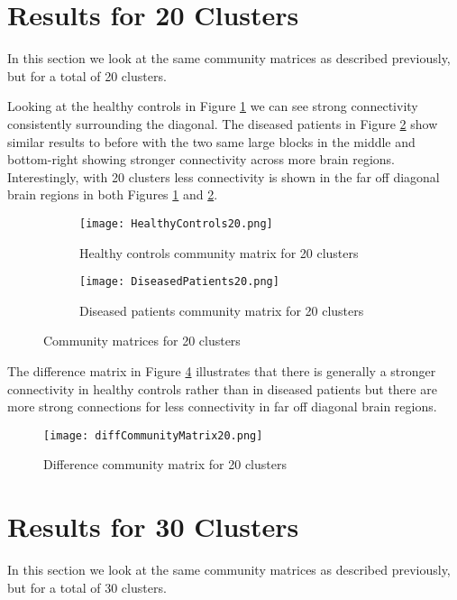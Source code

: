 \section{Results for 20 Clusters}
In this section we look at the same community matrices as described previously, but for a total of 20 clusters.

Looking at the healthy controls in Figure \ref{fig:CM20healthy} we can see strong connectivity consistently surrounding the diagonal. The diseased patients in Figure \ref{fig:CM20diseased} show similar results to before with the two same large blocks in the middle and bottom-right showing stronger connectivity across more brain regions. Interestingly, with 20 clusters less connectivity is shown in the far off diagonal brain regions in both Figures \ref{fig:CM20healthy} and \ref{fig:CM20diseased}.

\begin{figure}[h!] 
	\centering
	\begin{subfigure}[b]{.49\textwidth}
		\texttt{[image: HealthyControls20.png]}
		\caption{Healthy controls community matrix for 20 clusters}
		\label{fig:CM20healthy}
	\end{subfigure}
	\begin{subfigure}[b]{.49\textwidth}
		\texttt{[image: DiseasedPatients20.png]}
		\caption{Diseased patients community matrix for 20 clusters}
		\label{fig:CM20diseased}
	\end{subfigure}
	\caption{Community matrices for 20 clusters}
	\label{fig:CM20}
\end{figure}

The difference matrix in Figure \ref{fig:CM20diff} illustrates that there is generally a stronger connectivity in healthy controls rather than in diseased patients but there are more strong connections for  less connectivity in far off diagonal brain regions. 

\begin{figure}[h!] 
	\centering
	\texttt{[image: diffCommunityMatrix20.png]}
	\caption{Difference community matrix for 20 clusters}
	\label{fig:CM20diff}
\end{figure}

\section{Results for 30 Clusters}
In this section we look at the same community matrices as described previously, but for a total of 30 clusters.

